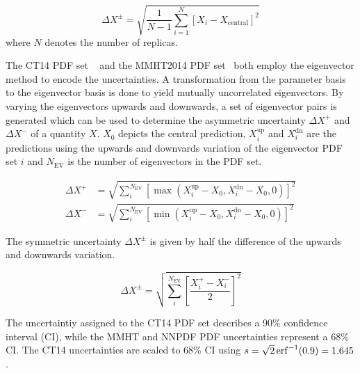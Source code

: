 \begin{equation*}
    \Delta X^{\pm} = \sqrt{\frac{1}{N-1} \sum_{i=1}^N \left[ X_{i} - X_{\mathrm{central}} \right]^2}
\end{equation*}
where $N$ denotes the number of replicas.

The CT14 PDF set ~\cite{Dulat:2015mca} and the MMHT2014 PDF
set~\cite{Harland-Lang:2014zoa} both employ the eigenvector method to encode the
uncertainties. A transformation from the parameter basis to the eigenvector
basis is done to yield mutually uncorrelated eigenvectors. By varying the
eigenvectors upwards and downwards, a set of eigenvector pairs is generated
which can be used to determine the asymmetric uncertainty $\Delta X^+$ and
$\Delta X^-$ of a quantity $X$. $X_0$ depicts the central prediction,
$X_i^{\mathrm{up}}$ and $X_i^{\mathrm{dn}}$ are the predictions using the
upwards and downvards variation of the eigenvector PDF set $i$ and
$N_{\mathrm{EV}}$ is the number of eigenvectors in the PDF set.

\begin{equation*}
\begin{aligned}
    \Delta X^+ &= \sqrt{\sum_i^{N_{\mathrm{EV}}} \left[ \max(X_i^{\mathrm{up}}
    -X_0, X_i^{\mathrm{dn}} - X_0, 0)\right]^2}\\
\Delta X^- &= \sqrt{\sum_i^{N_{\mathrm{EV}}} \left[ \min(X_i^{\mathrm{up}} - X_0, X_i^{\mathrm{dn}} - X_0,0)\right]^2}
\end{aligned}
\end{equation*}

The symmetric uncertainty $\Delta X^{\pm}$ is given by half the difference of the upwards and
downwards variation.

\begin{equation*}
    \Delta X^{\pm} = \sqrt{\sum_i^{N_{\mathrm{EV}}} \left[ \frac{X_i^+ -
    X_i^-}{2} \right]^2}
\end{equation*}

The uncertaintiy assigned to the CT14 PDF set describes a 90\% confidence
interval (CI), while the MMHT and NNPDF PDF uncertainties represent a 68\% CI.
The CT14 uncertainties are scaled to 68\% CI using $s = \sqrt{2}
\operatorname{erf}^{-1}(0.9) = 1.645$.

